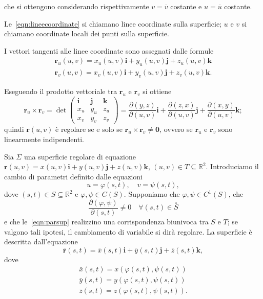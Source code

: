 \documentclass[a4paper]{book}
\numberwithin{equation}{section}
\renewcommand{\phi}{\varphi}
\theoremstyle{plain}
\theoremstyle{definition}
\theoremstyle{remark}
\renewcommand{\vec}{\boldsymbol}
\theoremstyle{example}
\begin{document}
che si ottengono considerando rispettivamente $v = \overline{v}$ costante e $u = \overline{u}$ costante.

Le~\eqref{eqn:lineecoordinate} si chiamano linee coordinate sulla superficie; $u$ e $v$ si chiamano coordinate locali dei punti sulla superficie.

I vettori tangenti alle linee coordinate sono assegnati dalle formule
\begin{gather*}
	\vec{r}_u(u, v) = x_u(u, v) \vec{i}+ y_u(u, v)\vec{j} + z_u(u, v)\vec{k} \\
	\vec{r}_v(u, v) = x_v(u,v)\vec{i}+y_v(u,v)\vec{j}+z_v(u,v)\vec{k}.
\end{gather*}

Eseguendo il prodotto vettoriale tra $\vec{r}_u$ e $\vec{r}_v$ si ottiene
\begin{equation*}
	\vec{r}_u \times \vec{r}_v = \det \begin{pmatrix}
	\vec{i} & \vec{j} & \vec{k} \\
	x_u & y_u & z_u \\
	x_v & y_v & z_v
	\end{pmatrix} = \frac{\partial (y, z)}{\partial (u, v)}\vec{i} + \frac{\partial(z, x)}{\partial (u,v)}\vec{j} + \frac{\partial (x, y)}{\partial (u, v)}\vec{k};
\end{equation*}
quindi $\vec{r}(u, v)$ è regolare se e solo se $\vec{r}_u \times \vec{r}_v \ne \vec{0}$, ovvero se $\vec{r}_u$ e $\vec{r}_v$ sono linearmente indipendenti.

Sia $\Sigma$ una superficie regolare di equazione $\vec{r}(u, v) = x(u, v)\vec{i} + y(u,v)\vec{j} + z(u,v)\vec{k}$, $(u ,v) \in T \subseteq \mathbb{R}^2$. Introduciamo il cambio di parametri definito dalle equazioni
\begin{equation}
	\label{eqn:parsup}
	u = \phi(s, t), \quad v = \psi(s, t),
\end{equation}
dove $(s, t) \in S \subseteq \mathbb{R}^2$ e $\phi, \psi \in C(S)$. Supponiamo che $\phi, \psi \in C^1(S)$, che
\begin{equation*}
	\frac{\partial (\phi, \psi)}{\partial (s, t)} \ne 0 \quad \forall (s, t) \in \overset{\circ}{S}
\end{equation*}
e che le~\eqref{eqn:parsup} realizzino una corrispondenza biunivoca tra $S$ e $T$; se valgono tali ipotesi, il cambiamento di variabile si dirà regolare. La superficie è descritta dall'equazione
\begin{equation*}
	\bar{\vec{r}}(s, t) = \bar{x}(s, t)\vec{i}+\bar{y}(s, t)\vec{j}+\bar{z}(s, t)\vec{k},
\end{equation*}
dove
\begin{gather*}
	\bar{x}(s, t) = x(\phi(s, t), \psi(s, t)) \\
	\bar{y}(s, t) = y(\phi(s, t), \psi(s, t)) \\
	\bar{z}(s, t) = z(\phi(s, t), \psi(s, t)).
\end{gather*}
\end{document}
